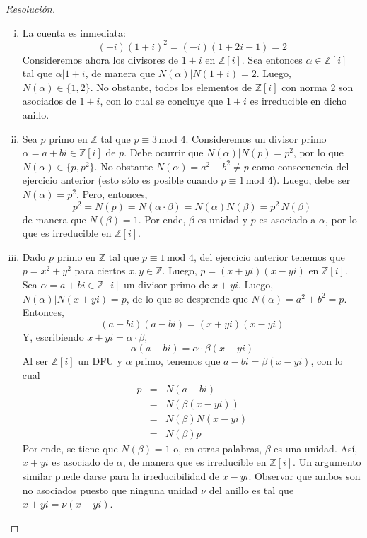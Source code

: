 \documentclass[a4paper,11pt]{article}
\newcommand{\ZZ}{\ensuremath{\mathbb{Z}}}
\newcommand{\Zm}[1]{\ensuremath{\mathbb{Z}[#1]}}
\newcommand{\Cong}[3]{\ensuremath{#1 \equiv #2 \, \textrm{mod } #3}}
\newcommand{\Div}[2]{\ensuremath{#1 | #2}}
\begin{document}
\begin{proof}[Resoluci\'on]
$ $
\begin{enumerate}[i.]
    \item La cuenta es inmediata:
    $$(-i)(1+i)^2 = (-i)(1 + 2i - 1) = 2$$
    Consideremos ahora los divisores de $1+i$ en \Zm{i}. Sea entonces
    $\alpha \in \Zm{i}$ tal que \Div{\alpha}{1+i}, de manera que
    $\Div{N(\alpha)}{N(1 + i) = 2}$. Luego, $N(\alpha) \in \{1, 2\}$.
    No obstante, todos los elementos de \Zm{i} con norma 2 son asociados
    de $1 + i$, con lo cual se concluye que $1 + i$ es irreducible en dicho anillo.

    \item Sea $p$ primo en $\ZZ$ tal que \Cong{p}{3}{4}. Consideremos un
    divisor primo $\alpha = a + bi \in \Zm{i}$ de $p$. Debe ocurrir que $\Div{N(\alpha)}{N(p) = p^2}$, 
    por lo que $N(\alpha) \in \{p, p^2\}$. No obstante $N(\alpha) = a^2 + b^2 \neq p$ como
    consecuencia del ejercicio anterior (esto sólo es posible cuando $\Cong{p}{1}{4}$). Luego,
    debe ser $N(\alpha) = p^2$. Pero, entonces,
    $$p ^2 = N(p) = N(\alpha \cdot \beta) = N(\alpha) N(\beta) = p^2 \, N(\beta)$$
    de manera que $N(\beta) = 1$. Por ende, $\beta$ es unidad y $p$ es asociado a $\alpha$,
    por lo que es irreducible en \Zm{i}.

    \item Dado $p$ primo en $\ZZ$ tal que $\Cong{p}{1}{4}$, del ejercicio anterior tenemos
    que $p = x^2 + y^2$ para ciertos $x, y \in \ZZ$. Luego, $p = (x + yi)(x -yi)$ en \Zm{i}.
    Sea $\alpha = a + bi \in \Zm{i}$ un divisor primo de $x + yi$. Luego,
    $\Div{N(\alpha)}{N(x+yi) = p}$, de lo que se desprende que $N(\alpha) = a^2 + b^2 = p$.
    Entonces,
    $$(a + bi)(a - bi) = (x + yi)(x - yi)$$
    Y, escribiendo $x + yi = \alpha \cdot \beta$,
    $$\alpha (a - bi) = \alpha \cdot \beta (x - yi)$$
    Al ser \Zm{i} un DFU y $\alpha$ primo, tenemos que $a - bi = \beta (x - yi)$, con
    lo cual
    \begin{eqnarray*}
        p &=& N(a - bi) \\ 
          &=& N(\beta (x - yi)) \\
          &=& N(\beta) N(x - yi) \\
          &=& N(\beta) p
    \end{eqnarray*}
    Por ende, se tiene que $N(\beta) = 1$ o, en otras palabras, $\beta$ es una unidad. Así,
    $x + yi$ es asociado de $\alpha$, de manera que es irreducible en \Zm{i}. Un argumento
    similar puede darse para la irreducibilidad de $x - yi$. Observar que ambos son no
    asociados puesto que ninguna unidad $\nu$ del anillo es tal que $x + yi = \nu (x - yi)$.


\end{enumerate}
\end{proof}
\end{document}
